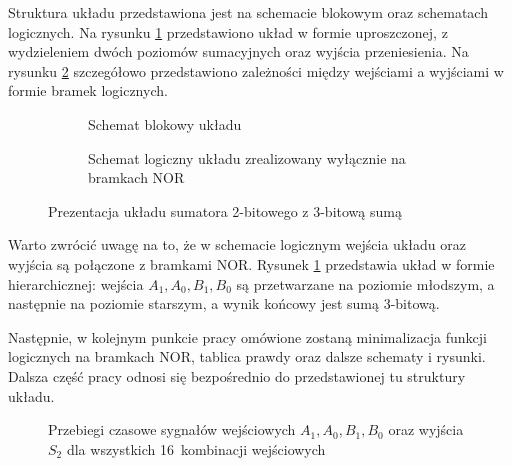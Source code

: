 \documentclass[11pt]{article}
\begin{document}
Struktura układu przedstawiona jest na schemacie blokowym oraz schematach logicznych. Na rysunku \ref{fig:schemat_bloku2} przedstawiono układ w formie uproszczonej, z wydzieleniem dwóch poziomów sumacyjnych oraz wyjścia przeniesienia. Na rysunku \ref{fig:schemat_logical2} szczegółowo przedstawiono zależności między wejściami a wyjściami w formie bramek logicznych.

\begin{figure}[h]
\centering
\begin{subfigure}[b]{0.97\linewidth}
    \centering
    \resizebox{\linewidth}{!}{\RysSchematBlokowy}
    \caption{Schemat blokowy układu}
    \label{fig:schemat_bloku2}
\end{subfigure}

\begin{subfigure}[b]{0.97\linewidth}
    \centering
    \resizebox{\linewidth}{!}{\RysSchematNOR}
    \caption{Schemat logiczny układu zrealizowany wyłącznie na bramkach NOR}
    \label{fig:schemat_logical2}
\end{subfigure}
\caption{Prezentacja układu sumatora 2-bitowego z 3-bitową sumą}
\label{fig:schematy_point2}
\end{figure}

Warto zwrócić uwagę na to, że w schemacie logicznym wejścia układu oraz wyjścia są połączone z bramkami NOR. Rysunek \ref{fig:schemat_bloku2} przedstawia układ w formie hierarchicznej: wejścia \(A_1, A_0, B_1, B_0\) są przetwarzane na poziomie młodszym, a następnie na poziomie starszym, a wynik końcowy jest sumą 3-bitową.

Następnie, w kolejnym punkcie pracy omówione zostaną minimalizacja funkcji logicznych na bramkach NOR, tablica prawdy oraz dalsze schematy i rysunki. Dalsza część pracy odnosi się bezpośrednio do przedstawionej tu struktury układu.

\begin{figure}[h]
\centering
\resizebox{0.85\linewidth}{!}{\RysPrzebiegi}
\caption{Przebiegi czasowe sygnałów wejściowych $A_1, A_0, B_1, B_0$ oraz wyjścia $S_2$ dla wszystkich 16~kombinacji wejściowych}
\label{fig:przejscie_point2}
\end{figure}
\end{document}
